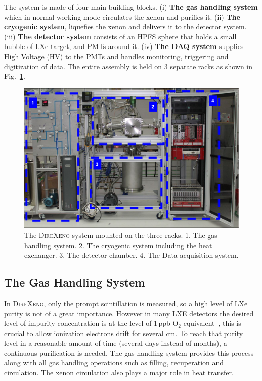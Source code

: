 The system is made of four main building blocks. (i) \textbf{The gas handling system} which in normal working mode circulates the xenon and purifies it. (ii) \textbf{The cryogenic system}, liquefies the xenon and 
delivers it to the detector system. (iii) \textbf{The detector system} consists of an HPFS sphere that 
holds a small bubble of LXe target, and PMTs around it. (iv) \textbf{The DAQ system} supplies High Voltage (HV) 
to the PMTs and handles monitoring, triggering and digitization of data. The entire assembly is held on 3 separate racks as shown in Fig.~\ref{fig:fulldet}.



\begin{figure}[h]
\centerline{\includegraphics[width=0.8\linewidth]{FullSys.png}}
\caption{The \textsc{DireXeno} system mounted on the three racks. 1. The gas handling system. 2. The cryogenic system including the heat exchanger. 3. The detector chamber. 4. The Data acquisition system.
\label{fig:fulldet}}
\end{figure}



\subsection{The Gas Handling System}
\label{subsec:gas}

In \textsc{DireXeno}, only the prompt scintillation is measured, so a high level of LXe purity is not of a great importance. However in many LXE detectors the desired level of impurity concentration is at the level of 1\,ppb O$_2$ equivalent~\cite{Aprile:2009dv}, this is crucial to allow 
ionization electrons drift for several cm. To reach that purity level in a reasonable amount 
of time (several days instead of months), 
a continuous purification is needed. The gas handling system provides this process along 
with all gas handling operations such as filling, recuperation and circulation. The xenon circulation also plays a major role in heat transfer.


